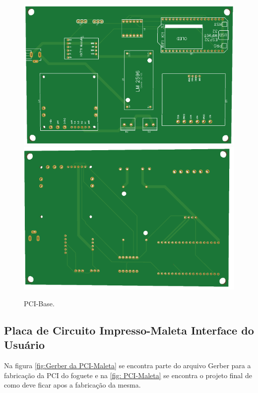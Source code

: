 \begin{figure}[H]
  \centering
  \includegraphics[scale=0.4]{Figuras/pci fabric/BASE_TOP.png}
    \includegraphics[scale=0.4]{Figuras/pci fabric/BASE_BOTTOM.png}
  \caption{ PCI-Base.}
  \label{fig: PCI-Base}
\end{figure}



\subsection{Placa de Circuito Impresso-Maleta Interface do Usuário}

\par Na figura \ref{fig:Gerber da PCI-Maleta} se encontra parte do arquivo Gerber para a fabricação da PCI do foguete e na \ref{fig: PCI-Maleta} se encontra o projeto final de como deve ficar apos a fabricação da mesma.

